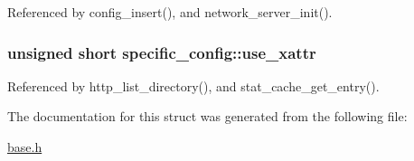 Referenced by config\-\_\-insert(), and network\-\_\-server\-\_\-init().

\hypertarget{structspecific__config_a72e8599d7067042f7c8746c555e5cb6b}{
\subsubsection[{use\-\_\-xattr}]{\setlength{\rightskip}{0pt plus 5cm}unsigned short specific\-\_\-config\-::use\-\_\-xattr}}\label{structspecific__config_a72e8599d7067042f7c8746c555e5cb6b}


Referenced by http\-\_\-list\-\_\-directory(), and stat\-\_\-cache\-\_\-get\-\_\-entry().



The documentation for this struct was generated from the following file\-:\begin{DoxyCompactItemize}
\item 
\hyperlink{base_8h}{base.\-h}\end{DoxyCompactItemize}
